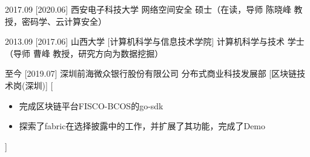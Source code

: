 \documentclass[zh]{resume}
\begin{document}
\makeheader

\begin{competences}



  
\end{competences}

\begin{myeducations}
  \myeducation
    {2017.09}
    [2020.06]
    {西安电子科技大学}
    {网络空间安全}%
    {硕士（在读，导师 陈晓峰 教授，密码学、云计算安全）}%

  \separator{0.1em}
  \myeducation
    {2013.09}
    [2017.06]
    {山西大学}
    [计算机科学与信息技术学院]
    {计算机科学与技术}%
    {学士（导师 曹峰 教授，研究方向为数据挖掘）}%
\end{myeducations}


\begin{experiences}
  \experience
    {至今}%
    [2019.07]%
    {深圳前海微众银行股份有限公司}%
    {分布式商业科技发展部}%
    [区块链技术岗(深圳)]%
    [\begin{itemize}
      \item{\icon{\faFlag}} 完成区块链平台FISCO-BCOS的go-sdk
      \item{\icon{\faFlag}} 探索了fabric在选择披露中的工作，并扩展了其功能，完成了Demo
    \end{itemize}]%

\end{experiences}
\end{document}
